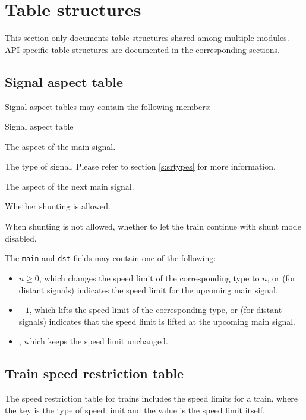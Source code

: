 \section{Table structures}\label{s:structs}

This section only documents table structures shared among multiple modules. API-specific table structures are documented in the corresponding sections.

\subsection{Signal aspect table}\label{s:sigasp}
Signal aspect tables may contain the following members:
\begin{apidoc}{Signal aspect table}
\item {} The aspect of the main signal.
\item {} The type of signal. Please refer to section \ref{s:srtypes} for more information.
\item {} The aspect of the next main signal.
\item {} Whether shunting is allowed.
\item {} When shunting is not allowed, whether to let the train continue with shunt mode disabled.
\end{apidoc}

The \texttt{main} and \texttt{dst} fields may contain one of the following:
\begin{itemize}
\item $n \geq 0$, which changes the speed limit of the corresponding type to $n$, or (for distant signals) indicates the speed limit for the upcoming main signal.
\item $-1$, which lifts the speed limit of the corresponding type, or (for distant signals) indicates that the speed limit is lifted at the upcoming main signal.
\item \luanil, which keeps the speed limit unchanged.
\end{itemize}

\subsection{Train speed restriction table}
The speed restriction table for trains includes the speed limits for a train, where the key is the type of speed limit and the value is the speed limit itself.

